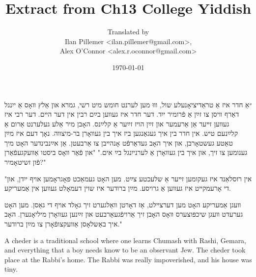 \documentclass{article}
\begin{document}
\renewcommand{\abstractname}{\vspace{-\baselineskip}}
\title{Extract from Ch13 College Yiddish}
\author{Translated by \\ Ilan Pillemer <ilan.pillemer@gmail.com>, \\ Alex O'Connor <alex.r.oconnor@gmail.com>}
\date{\today}

\maketitle
{}
\newline
\begin{pairs}

\begin{Rightside}
\begin{RTL}
\begin{hebrew}
\beginnumbering


\pstart
״אַ חדר איז אַ טראַדיציאָנעלע שול, װוּ מען לערנט חומש מיט רשי, גמרא און אַלץ װאָס אַ ייִנגל דאַרף װיסן צו זײַן אַ פֿרומיר ייִד.
דער חדר איז געװען בײַם רבין אין דער הײם. דער רבי איז געװען זײער אַן אַרעמער און זײַן הויז זײַער אַ קלײַנס. האָבן מיר אַלע געלערנט אַרום אַ קלײַנעם טיש. אין חדר בין איך געגאַנגען ביז איך בין געװאָרן בר-מיצװה.
 נאָך דעם איז מײַן טאַטע געשטאָרבן, און איך האָב געדאַרפֿט אָנהײבן צו אַרבעטן. אַן אײַנבינדער האָט מיך גענומען צו זיך, און איך בין געװאָרן אַ לערנייִנגל בײַ אים."
\pend
\pstart
"און פֿאַר װאָס ביסטו אַװעקגעפֿאַרן פֿון זשיטאָמיר?"

\pend
\pstart
"אין רוסלאַנד איז געקומען זײער אַ שלעכטע צײַט. מען האָט געמאַכט פּאָגראָמען אויף ייִדן, און די אָרעמקײט איז געװען אַ גרויסע.
מײַן ברודער איז שוין דעמאָלט געװען אין אַמעריקע.

 װעגן אַמעריקע האָט מען דערצײלט, אַז דאָרטן װאַלגערט זיך גאָלד אויף די גאַסן.
מען האָט גערעדט װעגן שיכפּוצערס װאָס האָבן זיך אַרויפֿגעאַרבעט און זײַנען געװאָרן מיליאָנערן. האָב איך באַשלאָסן אַװעקצופֿאָרן צו מײַן ברודער."

\pend
\endnumbering
\end{hebrew}
\end{RTL}
\end{Rightside}




\begin{Leftside}
\begin{english}
\beginnumbering
\pstart
A cheder is a traditional school where one learns Chumash with Rashi, Gemara\footnotemark[1], and everything that a boy needs know to be an observant Jew.
The cheder took place at the Rabbi's home. The Rabbi was really impoverished, and his house was tiny\footnotemark[2].


\end{english}
\end{Leftside}
\end{pairs}
\end{document}
